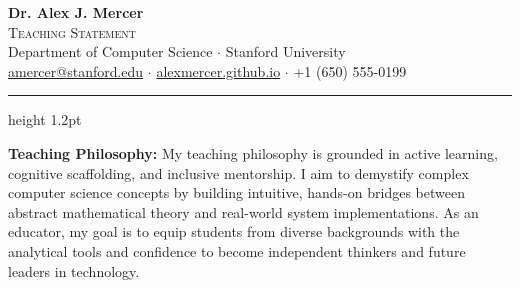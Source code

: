 \documentclass[10pt,a4paper]{article}
\begin{document}
\begin{center}
  {\fontsize{24pt}{28pt}\selectfont\color{accent}\bfseries Dr. Alex J. Mercer} \\
  \vspace{0.2em}
  {\fontsize{13pt}{16pt}\selectfont\scshape Teaching Statement} \\
  \vspace{0.4em}
  {\small \color{textgray} 
    Department of Computer Science $\cdot$ Stanford University \\
    \href{mailto:amercer@stanford.edu}{amercer@stanford.edu} $\cdot$ \href{https://alexmercer.github.io}{alexmercer.github.io} $\cdot$ +1 (650) 555-0199
  } \\
  \vspace{0.6em}
  \color{accent}\hrule height 1.2pt
\end{center}

\vspace{0.1em}

\begin{summarybox}
  \noindent\textbf{Teaching Philosophy:} My teaching philosophy is grounded in active learning, cognitive scaffolding, and inclusive mentorship. I aim to demystify complex computer science concepts by building intuitive, hands-on bridges between abstract mathematical theory and real-world system implementations. As an educator, my goal is to equip students from diverse backgrounds with the analytical tools and confidence to become independent thinkers and future leaders in technology.
\end{summarybox}







\end{document}
